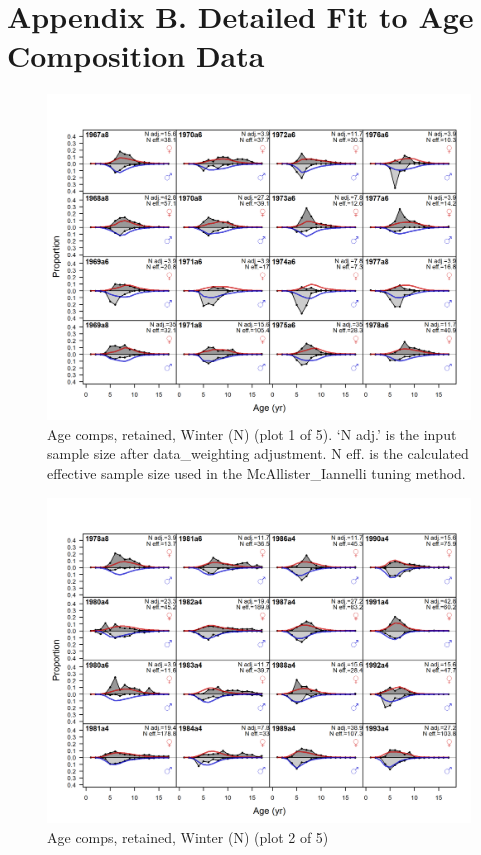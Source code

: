 \documentclass[12pt,]{article}
\begin{document}
\FloatBarrier

\section{Appendix B. Detailed Fit to Age Composition
Data}\label{appendix-b.-detailed-fit-to-age-composition-data}

\begin{figure}
\centering
\includegraphics{r4ss/plots_mod1/comp_agefit_flt1mkt2_page1.png}
\caption{Age comps, retained, Winter (N) (plot 1 of 5). `N adj.' is the
input sample size after data\_weighting adjustment. N eff. is the
calculated effective sample size used in the McAllister\_Iannelli tuning
method. \label{fig:age_fits}}
\end{figure}

\begin{figure}
\centering
\includegraphics{r4ss/plots_mod1/comp_agefit_flt1mkt2_page2.png}
\caption{Age comps, retained, Winter (N) (plot 2 of 5)
\label{fig:age_fits}}
\end{figure}
\end{document}
